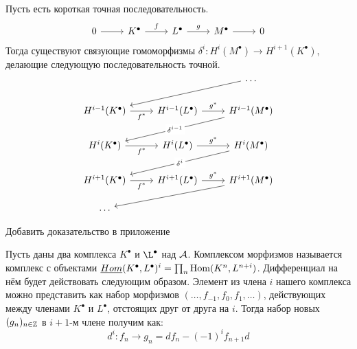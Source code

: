 \documentclass[../main.tex]{subfiles}
\begin{document}
\begin{to_suj}
Пусть есть короткая точная последовательность.
\begin{equation*}
    \begin{tikzcd}
	0 & {K^\bullet} & {L^\bullet} & {M^\bullet} & 0
	\arrow[from=1-1, to=1-2]
	\arrow["f", from=1-2, to=1-3]
	\arrow["g", from=1-3, to=1-4]
	\arrow[from=1-4, to=1-5]
\end{tikzcd}
\end{equation*}
Тогда существуют связующие гомоморфизмы $\delta^i: H^i(M^\bullet) \to H^{i+1}(K^\bullet)$, делающие следующую последовательность точной.
\begin{equation*}
    \begin{tikzcd}
	&& \ldots \\
	{H^{i-1}(K^\bullet)} & {H^{i-1}(L^\bullet)} & {H^{i-1}(M^\bullet)} \\
	{H^i(K^\bullet)} & {H^i(L^\bullet)} & {H^i(M^\bullet)} \\
	{H^{i+1}(K^\bullet)} & {H^{i+1}(L^\bullet)} & {H^{i+1}(M^\bullet)} \\
	\ldots
	\arrow[from=1-3, to=2-1]
	\arrow["{f^*}"', from=2-1, to=2-2]
	\arrow["{g^*}", from=2-2, to=2-3]
	\arrow["{\delta^{i-1}}"{description}, from=2-3, to=3-1]
	\arrow["{f^*}"', from=3-1, to=3-2]
	\arrow["{g^*}", from=3-2, to=3-3]
	\arrow["{\delta^i}"{description}, from=3-3, to=4-1]
	\arrow["{f^*}"', from=4-1, to=4-2]
	\arrow["{g^*}", from=4-2, to=4-3]
	\arrow[from=4-3, to=5-1]
\end{tikzcd}
\end{equation*}
\end{to_suj}
{\color{red}Добавить доказательство в приложение}
\begin{to_def}
\label{hHom}
Пусть даны два комплекса $K^\bullet$ и $\L^\bullet$ над $\mathcal{A}$. Комплексом морфизмов называется комплекс с объектами $\underline{Hom} (K^\bullet, L^\bullet)^i = \prod_n \operatorname{Hom}(K^n, L^{n+i})$. Дифференциал на нём будет действовать следующим образом. Элемент из члена $i$ нашего комплекса можно представить как набор морфизмов $(\ldots, f_{-1}, f_0, f_1, \ldots)$, действующих между членами $K^\bullet$ и $L^\bullet$, отстоящих друг от друга на $i$. Тогда набор новых $(g_n)_{n\in\mathbb{Z}}$ в $i+1$-м члене получим как:
\begin{equation*}
    d^i: f_n \to g_n = df_n - (-1)^if_{n+1}d
\end{equation*}
\end{to_def}
\end{document}
